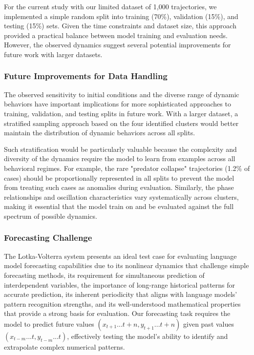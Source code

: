 \documentclass{article}
\begin{document}
For the current study with our limited dataset of 1,000 trajectories, we implemented a simple random split into training (70\%), validation (15\%), and testing (15\%) sets. Given the time constraints and dataset size, this approach provided a practical balance between model training and evaluation needs. However, the observed dynamics suggest several potential improvements for future work with larger datasets.

\subsubsection*{Future Improvements for Data Handling}
The observed sensitivity to initial conditions and the diverse range of dynamic behaviors have important implications for more sophisticated approaches to training, validation, and testing splits in future work. With a larger dataset, a stratified sampling approach based on the four identified clusters would better maintain the distribution of dynamic behaviors across all splits.

Such stratification would be particularly valuable because the complexity and diversity of the dynamics require the model to learn from examples across all behavioral regimes. For example, the rare "predator collapse" trajectories (1.2\% of cases) should be proportionally represented in all splits to prevent the model from treating such cases as anomalies during evaluation. Similarly, the phase relationships and oscillation characteristics vary systematically across clusters, making it essential that the model train on and be evaluated against the full spectrum of possible dynamics.


\subsubsection*{Forecasting Challenge}

The Lotka-Volterra system presents an ideal test case for evaluating language model forecasting capabilities due to its nonlinear dynamics that challenge simple forecasting methods, its requirement for simultaneous prediction of interdependent variables, the importance of long-range historical patterns for accurate prediction, its inherent periodicity that aligns with language models' pattern recognition strengths, and its well-understood mathematical properties that provide a strong basis for evaluation. Our forecasting task requires the model to predict future values $(x_{t+1}...t+n, y_{t+1}...t+n)$ given past values $(x_{t-m}...t, y_{t-m}...t)$, effectively testing the model's ability to identify and extrapolate complex numerical patterns.
\end{document}
